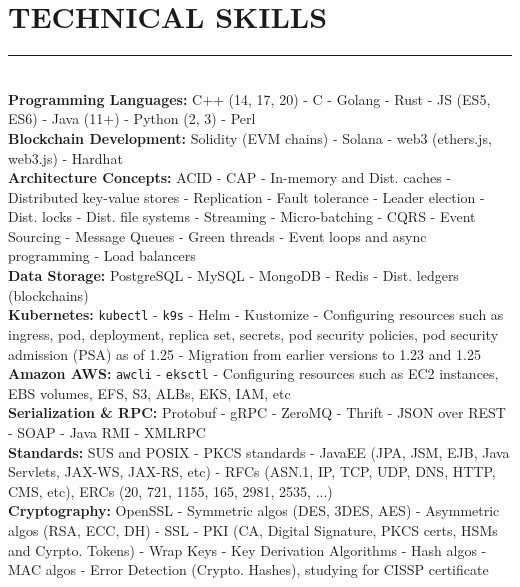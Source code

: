 \documentclass[10pt,a4paper]{article}
\begin{document}
\section{TECHNICAL SKILLS}
\noindent \rule {18.0cm}{0.2pt} \\
\noindent
\textbullet \hspace{0.1cm}\textbf{Programming Languages:} C++ (14, 17, 20) - C - Golang - Rust - JS (ES5, ES6) - Java (11+) - Python (2, 3) - Perl \\
\textbullet \hspace{0.1cm}\textbf{Blockchain Development:} Solidity (EVM chains) - Solana - web3 (ethers.js, web3.js) - Hardhat \\
\textbullet \hspace{0.1cm}\textbf{Architecture Concepts:} ACID - CAP - In-memory and Dist. caches - Distributed key-value stores - Replication - Fault tolerance - Leader election - Dist. locks - Dist. file systems - Streaming - Micro-batching - CQRS - Event Sourcing - Message Queues - Green threads - Event loops and async programming - Load balancers \\
\textbullet \hspace{0.1cm}\textbf{Data Storage:} PostgreSQL - MySQL - MongoDB - Redis - Dist. ledgers (blockchains) \\
\textbullet \hspace{0.1cm}\textbf{Kubernetes:} \texttt{kubectl} - \texttt{k9s} - Helm - Kustomize - Configuring resources such as ingress, pod, deployment, replica set, secrets, pod security policies, pod security admission (PSA) as of 1.25 - Migration from earlier versions to 1.23 and 1.25  \\
\textbullet \hspace{0.1cm}\textbf{Amazon AWS:} \texttt{awcli} - \texttt{eksctl} - Configuring resources such as EC2 instances, EBS volumes, EFS, S3, ALBs, EKS, IAM, etc \\
\textbullet \hspace{0.1cm}\textbf{Serialization \& RPC:} Protobuf - gRPC - ZeroMQ - Thrift - JSON over REST - SOAP - Java RMI - XMLRPC \\
\textbullet \hspace{0.1cm}\textbf{Standards:} SUS and POSIX - PKCS standards - JavaEE (JPA, JSM, EJB, Java Servlets, JAX-WS, JAX-RS, etc) - RFCs (ASN.1, IP, TCP, UDP, DNS, HTTP, CMS, etc), ERCs (20, 721, 1155, 165, 2981, 2535, ...) \\
\textbullet \hspace{0.1cm}\textbf{Cryptography:} OpenSSL - Symmetric algos (DES, 3DES, AES) - Asymmetric algos (RSA, ECC, DH) - SSL - PKI (CA, Digital Signature, PKCS certs, HSMs and Cyrpto. Tokens) - Wrap Keys - Key Derivation Algorithms - Hash algos - MAC algos - Error Detection (Crypto. Hashes), studying for CISSP certificate  \\ 
\end{document}
